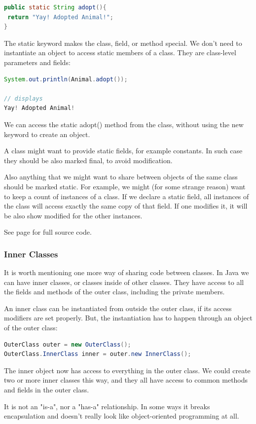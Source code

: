 \begin{lstlisting}[language=Java]
public static String adopt(){
 return "Yay! Adopted Animal!";
}
\end{lstlisting}

The static keyword makes the class, field, or method special. We don't need to instantiate an object to access static members of a class. They are class-level parameters and fields:
\begin{lstlisting}[language=Java]
System.out.println(Animal.adopt());

// displays
Yay! Adopted Animal!
\end{lstlisting}
We can access the static adopt() method from the class, without using the new keyword to create an object.

A class might want to provide static fields, for example constants. In such case they should be also marked final, to avoid modification.

Also anything that we might want to share between objects of the same class should be marked static. For example, we might (for some strange reason) want to keep a count of instances of a class. If we declare a static field, all instances of the class will access exactly the same copy of that field. If one modifies it, it will be also show modified for the other instances.

See page \pageref{App:AppendixJTest} for full source code.

\subsubsection{Inner Classes}
It is worth mentioning one more way of sharing code between classes. In Java we can have inner classes, or classes inside of other classes. They have access to all the fields and methods of the outer class, including the private members.

An inner class can be instantiated from outside the outer class, if its access modifiers are set properly. But, the instantiation has to happen through an object of the outer class:
\begin{lstlisting}[language=Java]
OuterClass outer = new OuterClass();
OuterClass.InnerClass inner = outer.new InnerClass();
\end{lstlisting}

The inner object now has access to everything in the outer class. We could create two or more inner classes this way, and they all have access to common methods and fields in the outer class. 

It is not an "is-a", nor a "has-a" relationship. In some ways it breaks encapsulation and doesn't really look like object-oriented programming at all.